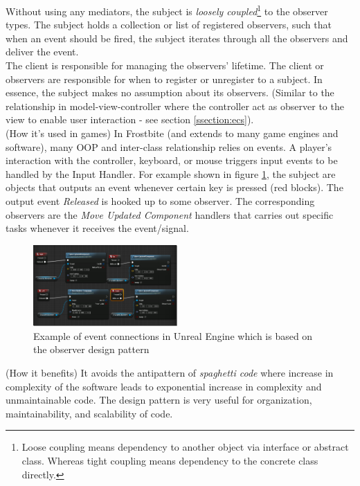 \documentclass[10pt,letterpaper]{article}
\newcommand{\bs}{\bigskip}
\begin{document}
\begin{multicols}{2}
Without using any mediators, the subject is \textit{loosely coupled}\footnote{Loose coupling means dependency to another object via interface or abstract class. Whereas tight coupling means dependency to the concrete class directly.} to the observer types. The subject holds a collection or list of registered observers, such that when an event should be fired, the subject iterates through all the observers and deliver the event.\bs
\\
The client is responsible for managing the observers' lifetime. The client or observers are responsible for when to register or unregister to a subject. In essence, the subject makes no assumption about its observers. (Similar to the relationship in model-view-controller where the controller act as observer to the view to enable user interaction - see section \ref{ssection:ecs}).\bs
\\
(How it's used in games)
In Frostbite (and extends to many game engines and software), many OOP and inter-class relationship relies on events. A player's interaction with the controller, keyboard, or mouse triggers input events to be handled by the Input Handler. For example shown in figure \ref{fig:unreal-input}, the subject are objects that outputs an event whenever certain key is pressed (red blocks). The output event \textit{Released} is hooked up to some observer. The corresponding observers are the \textit{Move Updated Component} handlers that carries out specific tasks whenever it receives the event/signal.

\begin{figure}[H]
	\centering
	\includegraphics[width=0.49\textwidth]{assets/unreal-input}
	\caption{Example of event connections in Unreal Engine which is based on the observer design pattern}
	\label{fig:unreal-input}
\end{figure}

(How it benefits)
It avoids the antipattern of \textit{spaghetti code} where increase in complexity of the software leads to exponential increase in complexity and unmaintainable code. The design pattern is very useful for organization, maintainability, and scalability of code.


\end{multicols}
\end{document}
